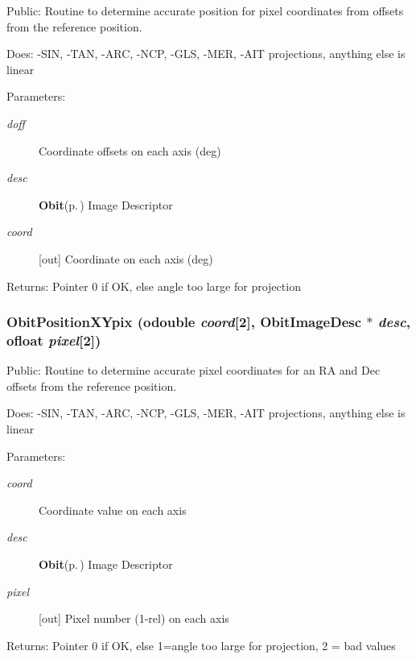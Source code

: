 Public: Routine to determine accurate position for pixel coordinates from offsets from the reference position. 

Does: -SIN, -TAN, -ARC, -NCP, -GLS, -MER, -AIT projections, anything else is linear

\begin{Desc}
\item[Parameters:]
\begin{description}
\item[{\em doff}]Coordinate offsets on each axis (deg) \item[{\em desc}]{\bf Obit}{\rm (p.\,\pageref{structObit})} Image Descriptor \item[{\em coord}][out] Coordinate on each axis (deg) \end{description}
\end{Desc}
\begin{Desc}
\item[Returns:]Pointer 0 if OK, else angle too large for projection \end{Desc}
\subsubsection{ Obit\-Position\-XYpix ({\bf odouble} {\em coord}[2], {\bf Obit\-Image\-Desc} $\ast$ {\em desc}, {\bf ofloat} {\em pixel}[2])}\label{ObitPosition_8c_a2}


Public: Routine to determine accurate pixel coordinates for an RA and Dec offsets from the reference position. 

Does: -SIN, -TAN, -ARC, -NCP, -GLS, -MER, -AIT projections, anything else is linear

\begin{Desc}
\item[Parameters:]
\begin{description}
\item[{\em coord}]Coordinate value on each axis \item[{\em desc}]{\bf Obit}{\rm (p.\,\pageref{structObit})} Image Descriptor \item[{\em pixel}][out] Pixel number (1-rel) on each axis \end{description}
\end{Desc}
\begin{Desc}
\item[Returns:]Pointer 0 if OK, else 1=angle too large for projection, 2 = bad values \end{Desc}
